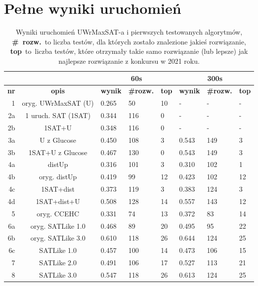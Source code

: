 \documentclass[shortabstract]{iithesis}
\begin{document}
\chapter{Pełne wyniki uruchomień}
\begin{table}[h]
	\centering
	\begin{tabular}{|r|c|p{1.1cm}|p{1.5cm}|p{1cm}|p{1.1cm}|p{1.5cm}|p{1cm}|}
		\hline
	 & & \multicolumn{3}{|c|}{60s} & \multicolumn{3}{|c|}{300s} \\
		\hline
		\textbf{nr} & \textbf{opis} & \textbf{wynik} & \textbf{\#rozw.} & \textbf{top} & \textbf{wynik} & \textbf{\#rozw.} & \textbf{top} \\
		\hline
		1 & oryg. UWrMaxSAT (U) & 0.265 & 50 & 10 & - & - & -\\
		\hline
		2a & 1 uruch. SAT (1SAT) & 0.344 & 116 & 0 & - & - & - \\
		\hline
		2b & 1SAT+U & 0.348 & 116 & 0 & - & - & - \\
		\hline
		3a & U z Glucose & 0.450 & 108 & 3 & 0.543 & 149 & 3 \\
		\hline
		3b & 1SAT+U z Glucose & 0.467 & 130 & 0 & 0.543 & 149 & 3 \\
		\hline
		4a & distUp & 0.316 & 101 & 3 & 0.310 & 102 & 1 \\
		\hline
		4b & oryg. distUp & 0.419 & 99 & 12 & 0.423 & 102 & 12 \\
		\hline		
		4c & 1SAT+dist & 0.373 & 119 & 3 & 0.383 & 124 & 3 \\
		\hline
		4d & 1SAT+dist+U & 0.508 & 128 & 14 & 0.557 & 143 & 12 \\
		\hline
		5 & oryg. CCEHC & 0.331 & 74 & 13 & 0.372 & 83 & 14 \\
		\hline
		6a & oryg. SATLike 1.0 & 0.468 & 89 & 20 & 0.495 & 95 & 22 \\
		\hline		
		6b & oryg. SATLike 3.0 & 0.610 & 118 & 26 & 0.644 & 124 & 25 \\
		\hline
		6c & SATLike 1.0 & 0.457 & 100 & 14 & 0.473 & 106 & 15 \\
		\hline
		7 & SATLike 2.0 & 0.491 & 106 & 17 & 0.527 & 113 & 21 \\
		\hline		
		8 & SATLike 3.0 & 0.547 & 118 & 26 & 0.613 & 124 & 25 \\
		\hline		
	\end{tabular} \\
	
	\label{eksperymenty}
	\caption{Wyniki uruchomień UWrMaxSAT-a i pierwszych testowanych algorytmów, \textbf{\#~rozw.}~to liczba testów, dla których zostało znalezione jakieś rozwiązanie, \textbf{top}~to~liczba testów, które otrzymały takie samo rozwiązanie (lub lepsze) jak najlepsze rozwiązanie z konkursu w 2021 roku.}
\end{table}
\end{document}
